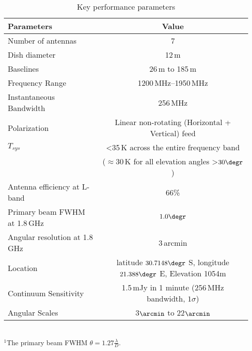 
\begin{table*}
\caption{Key performance parameters}
\begin{tabular}{lc}
\textbf{Parameters} & \textbf{Value} \\
\hline
Number of antennas        & 7 \\
Dish diameter             & 12\,m \\
Baselines                 & 26\,m to 185\,m \\
Frequency Range           & 1200\,MHz--1950\,MHz \\
Instantaneous Bandwidth   & 256\,MHz \\
Polarization              & Linear non-rotating (Horizontal + Vertical) feed \\
$T_{sys}$                 & \textless 35\,K across the entire frequency band \\
                         & ($\approx 30$\,K for all elevation angles \textgreater $30\degr$)\\
Antenna efficiency at L-band & 66\% \\
Primary beam FWHM at 1.8\,GHz & $1.0\degr$ \footnotemark[1] \\
Angular resolution at 1.8 GHz & 3\,arcmin \\
Location                 & latitude $30.7148\degr$ S, longitude $21.388\degr$ E, Elevation 1054m \\
Continuum Sensitivity    & 1.5\,mJy in 1 minute (256\,MHz bandwidth, $1\sigma$)\\
Angular Scales           & 3$\arcmin$ to 22$\arcmin$ \\
\hline
\end{tabular}
\\
$^1$The primary beam FWHM $\theta = 1.27\frac{\lambda}{D}$.\\
\label{table:array}
\medskip
\end{table*}


